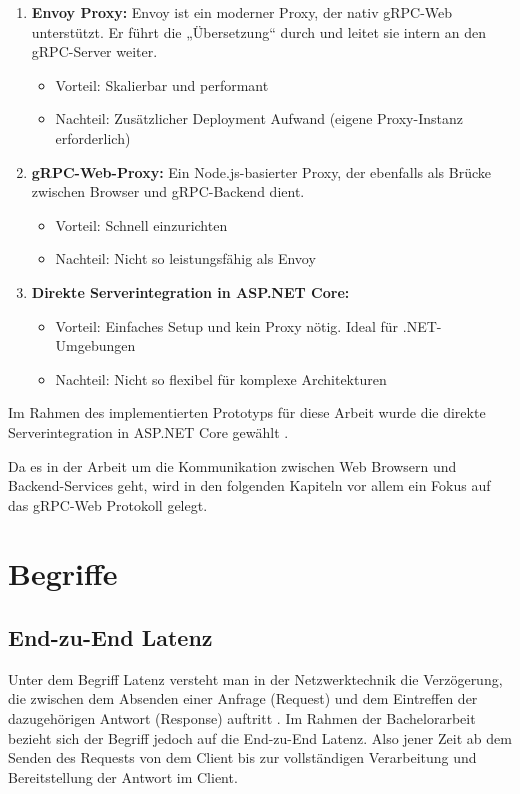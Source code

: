 \begin{enumerate}
	\item \textbf{Envoy Proxy:}
	Envoy ist ein moderner Proxy, der nativ gRPC-Web unterstützt. Er führt die „Übersetzung“ durch und leitet sie intern an den gRPC-Server weiter.	
	\begin{itemize}
		\item Vorteil: Skalierbar und performant
		\item Nachteil: Zusätzlicher Deployment Aufwand (eigene Proxy-Instanz erforderlich)
	\end{itemize}
	
	\item \textbf{gRPC-Web-Proxy:}
	Ein Node.js-basierter Proxy, der ebenfalls als Brücke zwischen Browser und gRPC-Backend dient.
	\begin{itemize}
		\item Vorteil: Schnell einzurichten
		\item Nachteil: Nicht so leistungsfähig als Envoy
	\end{itemize}

	
	\item \textbf{Direkte Serverintegration in ASP.NET Core:}
	\begin{itemize}
		\item Vorteil: Einfaches Setup und kein Proxy nötig. Ideal für .NET-Umgebungen
		\item Nachteil: Nicht so flexibel für komplexe Architekturen
	\end{itemize}
\end{enumerate}

Im Rahmen des implementierten Prototyps für diese Arbeit wurde die direkte Serverintegration in ASP.NET Core gewählt \parencite{grpc-web-docs,aspnet-grpcweb}.

Da es in der Arbeit um die Kommunikation zwischen Web Browsern und Backend-Services geht, wird in den folgenden Kapiteln vor allem ein Fokus auf das gRPC-Web Protokoll gelegt.

\clearpage
\section{Begriffe}
\subsection{End-zu-End Latenz}
Unter dem Begriff Latenz versteht man in der Netzwerktechnik die Verzögerung, die zwischen dem Absenden einer Anfrage (Request) und dem Eintreffen der dazugehörigen Antwort (Response) auftritt \parencite{aws-latency}. Im Rahmen der Bachelorarbeit bezieht sich der Begriff jedoch auf die End-zu-End Latenz. Also jener Zeit ab dem Senden des Requests von dem Client bis zur vollständigen Verarbeitung und Bereitstellung der Antwort im Client. 


